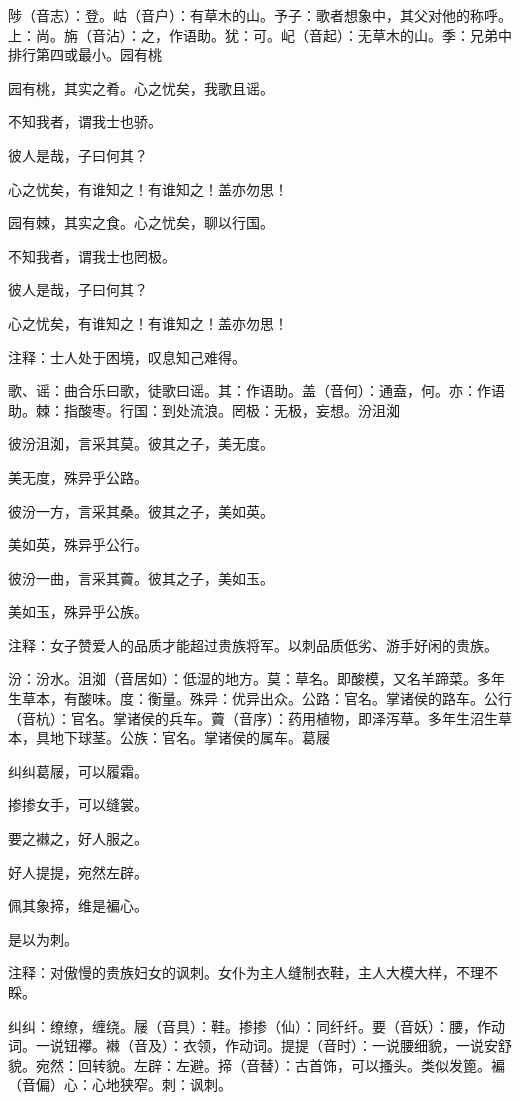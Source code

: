\documentclass[12pt,UTF8]{ctexbook}
\begin{document}
陟（音志）：登。岵（音户）：有草木的山。予子：歌者想象中，其父对他的称呼。上：尚。旃（音沾）：之，作语助。犹：可。屺（音起）：无草木的山。季：兄弟中排行第四或最小。园有桃

园有桃，其实之肴。心之忧矣，我歌且谣。

不知我者，谓我士也骄。

彼人是哉，子曰何其？

心之忧矣，有谁知之！有谁知之！盖亦勿思！

园有棘，其实之食。心之忧矣，聊以行国。

不知我者，谓我士也罔极。

彼人是哉，子曰何其？

心之忧矣，有谁知之！有谁知之！盖亦勿思！

注释：士人处于困境，叹息知己难得。

歌、谣：曲合乐曰歌，徒歌曰谣。其：作语助。盖（音何）：通盍，何。亦：作语助。棘：指酸枣。行国：到处流浪。罔极：无极，妄想。汾沮洳

彼汾沮洳，言采其莫。彼其之子，美无度。

美无度，殊异乎公路。

彼汾一方，言采其桑。彼其之子，美如英。

美如英，殊异乎公行。

彼汾一曲，言采其藚。彼其之子，美如玉。

美如玉，殊异乎公族。

注释：女子赞爱人的品质才能超过贵族将军。以刺品质低劣、游手好闲的贵族。

汾：汾水。沮洳（音居如）：低湿的地方。莫：草名。即酸模，又名羊蹄菜。多年生草本，有酸味。度：衡量。殊异：优异出众。公路：官名。掌诸侯的路车。公行（音杭）：官名。掌诸侯的兵车。藚（音序）：药用植物，即泽泻草。多年生沼生草本，具地下球茎。公族：官名。掌诸侯的属车。葛屦

纠纠葛屦，可以履霜。

掺掺女手，可以缝裳。

要之襋之，好人服之。

好人提提，宛然左辟。

佩其象揥，维是褊心。

是以为刺。

注释：对傲慢的贵族妇女的讽刺。女仆为主人缝制衣鞋，主人大模大样，不理不睬。

纠纠：缭缭，缠绕。屦（音具）：鞋。掺掺（仙）：同纤纤。要（音妖）：腰，作动词。一说钮襻。襋（音及）：衣领，作动词。提提（音时）：一说腰细貌，一说安舒貌。宛然：回转貌。左辟：左避。揥（音替）：古首饰，可以搔头。类似发篦。褊（音偏）心：心地狭窄。刺：讽刺。
\end{document}

